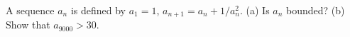 A sequence $a_n$ is defined by $a_1 = 1$, $a_{n+1} = a_n + 1/a_n^2$. (a) Is $a_n$ bounded? (b) Show that $a_{9000} > 30$.
